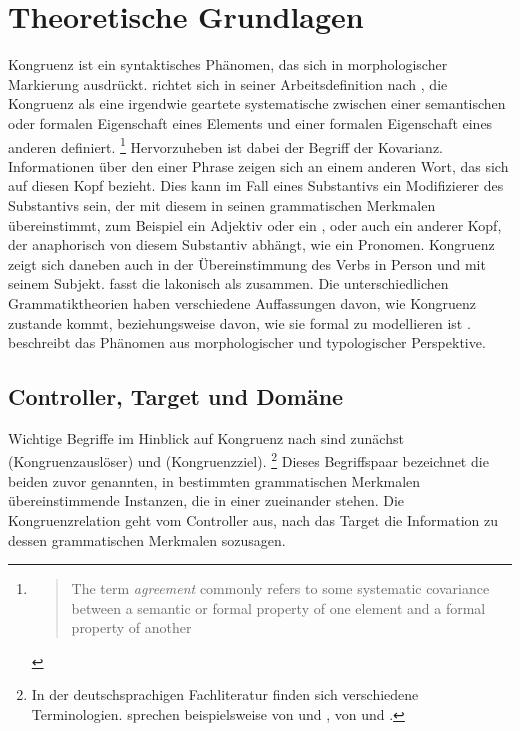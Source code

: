 \chapter{Theoretische Grundlagen}
\label{ch:theorie}

Kongruenz ist ein syntaktisches Phänomen, das sich in morphologischer
Markierung ausdrückt. \citet{corbett2006} richtet sich in seiner
Arbeitsdefinition nach \citet[610]{steele1978}, die Kongruenz als eine
irgendwie geartete systematische  zwischen einer semantischen
oder formalen Eigenschaft eines Elements und einer formalen Eigenschaft eines
anderen definiert.%
%
	\footnote{\blockcquote[610]{steele1978}{The term \emph{agreement} commonly
		refers to some systematic covariance between a semantic or formal
		property of one element and a formal property of another}.%
	}
%
Hervorzuheben ist dabei der Begriff der Kovarianz. Informationen über den
 einer Phrase zeigen sich an einem anderen Wort, das sich auf diesen
Kopf bezieht. Dies kann im Fall eines Substantivs ein
Modifizierer des Substantivs sein, der mit diesem in seinen grammatischen
Merkmalen übereinstimmt, zum Beispiel ein
Adjektiv oder ein , oder auch ein anderer
Kopf, der anaphorisch von diesem Substantiv abhängt, wie ein
Pronomen. Kongruenz zeigt sich daneben auch in der Übereinstimmung des Verbs in
Person und  mit seinem Subjekt. \citet[20]{corbett2006} fasst die
 lakonisch als  zusammen. Die unterschiedlichen Grammatiktheorien
haben verschiedene Auffassungen davon, wie Kongruenz zustande kommt,
beziehungsweise davon, wie sie formal zu modellieren ist
\autocite[siehe~z.\,B.][]{mueller2023}. \citeauthor{corbett2006} beschreibt das
Phänomen aus morphologischer und typologischer Perspektive.


\section{Controller, Target und Domäne}
\label{sec:ctrltarg}


Wichtige Begriffe im Hinblick auf Kongruenz nach \citet{corbett2006} sind
zunächst  (Kongruenzauslöser) und  (Kongruenzziel).%
%
	\footnote{In der deutschsprachigen Fachliteratur finden sich verschiedene
	Terminologien. \citet{fleischerschallert2011} sprechen beispielsweise von
	 und , \citet{panther2009} von
	 und .}
%
Dieses Begriffspaar bezeichnet die beiden zuvor genannten, in bestimmten
grammatischen Merkmalen übereinstimmende Instanzen,
die in einer  zueinander stehen. Die
Kongruenzrelation geht vom Controller aus, nach \citeauthor{corbett2006}
 das Target die Information zu dessen grammatischen
Merkmalen sozusagen.

